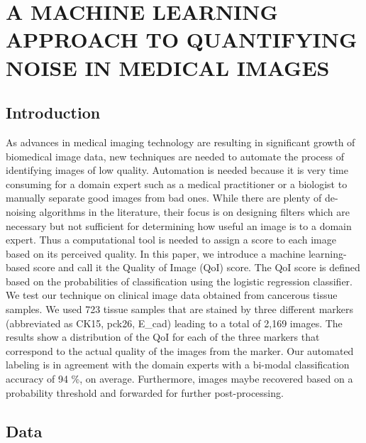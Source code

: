 \chapter{A MACHINE LEARNING APPROACH TO QUANTIFYING NOISE IN MEDICAL IMAGES}
\label{chap:SPIE}

\let\thefootnote\relax{}

\section{Introduction}

As advances in medical imaging technology are resulting in significant growth of biomedical image data, new techniques are needed to automate the process of identifying images of low quality. Automation is needed because it is very time consuming for a domain expert such as a medical practitioner or a biologist to manually separate good images from bad ones. While there are plenty of de-noising algorithms in the literature, their focus is on designing filters which are necessary but not sufficient for determining how useful an image is to a domain expert.
Thus a computational tool is needed to assign a score to each image based on its perceived quality. In this paper, we introduce a machine learning-based score and call it the Quality of Image (QoI) score. The QoI score is defined based on the probabilities of classification using the logistic regression classifier.
We test our technique on clinical image data obtained from cancerous tissue samples. We used 723 tissue samples that are stained by three different markers (abbreviated as CK15, pck26, E\_cad) leading to a total of 2,169 images. The results show a distribution of the QoI for each of the three markers that correspond to the actual quality of the images from the marker. Our automated labeling is in agreement with the domain experts with a bi-modal classification accuracy of 94 \%, on average. Furthermore, images maybe recovered based on a probability threshold and forwarded for further post-processing.

\section{Data}

